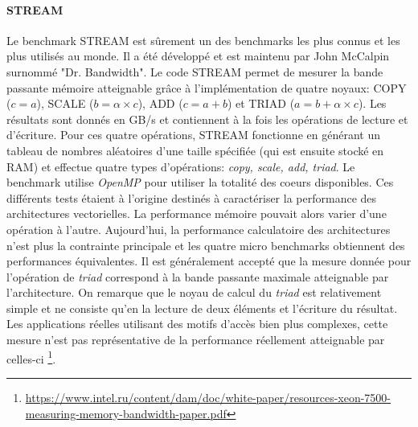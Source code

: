        
        
     
        \paragraph{STREAM \cite{McCalpin1995}} 
        
        
            Le benchmark STREAM est sûrement un des benchmarks les plus connus et les plus utilisés au monde. Il a été développé et est maintenu par John McCalpin surnommé "Dr. Bandwidth". Le code STREAM permet de mesurer la bande passante mémoire atteignable grâce à l'implémentation de quatre noyaux: COPY ($c=a$), SCALE ($b=\alpha \times c$), ADD ($c=a+b$) et TRIAD ($a=b+\alpha \times c$). Les résultats sont donnés en GB/s et contiennent à la fois les opérations de lecture et d'écriture. Pour ces quatre opérations, STREAM fonctionne en générant un tableau de nombres aléatoires d'une taille spécifiée (qui est ensuite stocké en RAM) et effectue quatre types d'opérations: \textit{copy, scale, add, triad}.  Le benchmark utilise \textit{OpenMP} pour utiliser la totalité des coeurs disponibles. Ces différents tests étaient à l'origine destinés à caractériser la performance des architectures vectorielles. La performance mémoire pouvait alors varier d'une opération à l'autre. Aujourd'hui, la performance calculatoire des architectures n'est plus la contrainte principale et les quatre micro benchmarks obtiennent des performances équivalentes. Il est généralement accepté que la mesure donnée pour l'opération de \textit{triad} correspond à la bande passante maximale atteignable par l'architecture. On remarque que le noyau de calcul du \textit{triad} est relativement simple et ne consiste qu'en la lecture de deux éléments et l'écriture du résultat. Les applications réelles utilisant des motifs d'accès bien plus complexes, cette mesure n'est pas représentative de la performance réellement atteignable par celles-ci \footnote{\url{https://www.intel.ru/content/dam/doc/white-paper/resources-xeon-7500-measuring-memory-bandwidth-paper.pdf}}.
            
